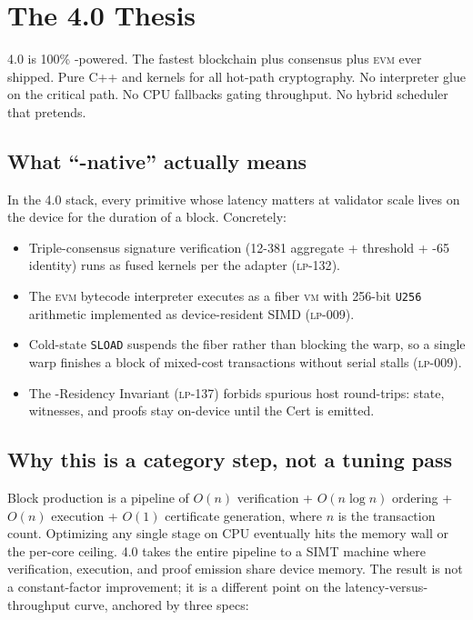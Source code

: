 \section{The 4.0 Thesis}
\label{sec:thesis}

\Zoo{} 4.0 is 100\% \GPU{}-powered. The fastest blockchain plus consensus plus
\textsc{evm} ever shipped. Pure C++ and \GPU{} kernels for all hot-path
cryptography. No interpreter glue on the critical path. No CPU fallbacks
gating throughput. No hybrid scheduler that pretends.

\subsection{What ``\GPU{}-native'' actually means}

In the \Zoo{} 4.0 stack, every primitive whose latency matters at validator
scale lives on the \GPU{} device for the duration of a block. Concretely:

\begin{itemize}[leftmargin=1.2em]
  \item Triple-consensus signature verification (\BLS{}12-381 aggregate +
        \Ringtail{} threshold + \MLDSA{}-65 identity) runs as fused
        \GPU{} kernels per the \QuasarGPU{} adapter (\textsc{lp-132}).
  \item The \textsc{evm} bytecode interpreter executes as a fiber
        \textsc{vm} with 256-bit \texttt{U256} arithmetic implemented as
        device-resident SIMD (\textsc{lp-009}).
  \item Cold-state \texttt{SLOAD} suspends the fiber rather than blocking the
        warp, so a single warp finishes a block of mixed-cost transactions
        without serial stalls (\textsc{lp-009}).
  \item The \GPU{}-Residency Invariant (\textsc{lp-137}) forbids spurious
        host round-trips: state, witnesses, and proofs stay on-device until
        the \Quasar{}Cert is emitted.
\end{itemize}

\subsection{Why this is a category step, not a tuning pass}

Block production is a pipeline of $O(n)$ verification + $O(n \log n)$
ordering + $O(n)$ execution + $O(1)$ certificate generation, where $n$ is
the transaction count. Optimizing any single stage on CPU eventually hits
the memory wall or the per-core ceiling. \Zoo{} 4.0 takes the entire
pipeline to a SIMT machine where verification, execution, and proof
emission share device memory. The result is not a constant-factor
improvement; it is a different point on the latency-versus-throughput
curve, anchored by three specs:

